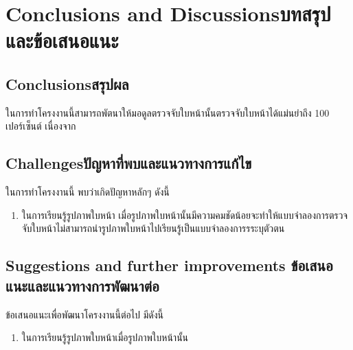 \chapter{\ifenglish Conclusions and Discussions\else บทสรุปและข้อเสนอแนะ\fi}

\section{\ifenglish Conclusions\else สรุปผล\fi}

ในการทำโครงงานนี้สามารถพัตนาให้มอดูลตรวจจับใบหน้านั้นตรวจจับใบหน้าได้แม่นยำถึง 100 เปอร์เซ็นต์ เนื่องจาก


\section{\ifenglish Challenges\else ปัญหาที่พบและแนวทางการแก้ไข\fi}

ในการทำโครงงานนี้ พบว่าเกิดปัญหาหลักๆ ดังนี้
\begin{enumerate}
    \item ในการเรียนรู้รูปภาพใบหน้า เมื่อรูปภาพใบหน้านั้นมีความคมชัดน้อยจะทำให้แบบจำลองการตรวจจับใบหน้าไม่สามารถนำรูปภาพใบหน้าไปเรียนรู้เป็นแบบจำลองการรระบุตัวตน
\end{enumerate}



\section{\ifenglish%
Suggestions and further improvements
\else%
ข้อเสนอแนะและแนวทางการพัฒนาต่อ
\fi
}

ข้อเสนอแนะเพื่อพัฒนาโครงงานนี้ต่อไป มีดังนี้
\begin{enumerate}
    \item ในการเรียนรู้รูปภาพใบหน้าเมื่อรูปภาพใบหน้านั้น
\end{enumerate}
